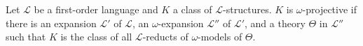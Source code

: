 Let $\mathcal{L}$ be a first-order language and $K$ a class of $\mathcal{L}$-structures. $K$ is $\omega$-projective if there is an expansion $\mathcal{L}'$ of $\mathcal{L}$, an $\omega$-expansion $\mathcal{L}''$ of $\mathcal{L}'$, and a theory $\Theta$ in $\mathcal{L}''$ such that $K$ is the class of all $\mathcal{L}$-reducts of $\omega$-models of $\Theta$.
